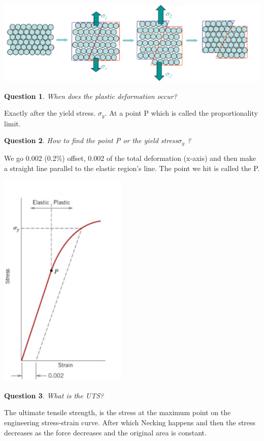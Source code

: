 \documentclass[13]{article}
\newtheorem{exer}{Question}
\begin{document}
\begin{center}
\includegraphics[scale=0.5]{figures/3.png}
\end{center}
\begin{exer}
When does the plastic deformation occur?
\end{exer}
Exactly after the yield stress. $\sigma_y$. At a point P which is called the proportionality limit.
\begin{exer}
	How to find the point P or the yield stress$\sigma_y$ ?
\end{exer}
We go 0.002 (0.2\%) offset, 0.002 of the total deformation (x-axis) and then make a straight line parallel to the elastic region's line. The point we hit is called the P.
\begin{center}
\includegraphics[scale=0.5]{figures/4.png}
\end{center}
\begin{exer}
What is the UTS?
\end{exer}
The ultimate tensile strength, is the stress at the maximum point on the engineering stress-strain curve. After which Necking happens and then the stress decreases as the force decreases and the original area is constant. 
\end{document}
